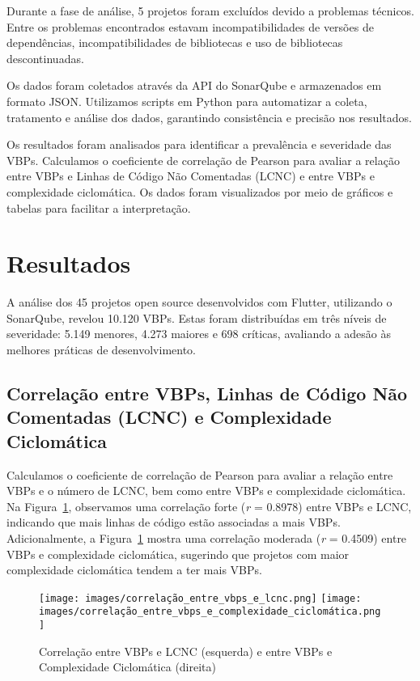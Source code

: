 \documentclass[12pt]{article}
\begin{document}
Durante a fase de análise, 5 projetos foram excluídos devido a problemas técnicos. Entre os problemas encontrados estavam incompatibilidades de versões de dependências, incompatibilidades de bibliotecas e uso de bibliotecas descontinuadas.

Os dados foram coletados através da API do SonarQube e armazenados em formato JSON. Utilizamos scripts em Python para automatizar a coleta, tratamento e análise dos dados, garantindo consistência e precisão nos resultados. 

Os resultados foram analisados para identificar a prevalência e severidade das VBPs. Calculamos o coeficiente de correlação de Pearson para avaliar a relação entre VBPs e Linhas de Código Não Comentadas (LCNC) e entre VBPs e complexidade ciclomática. Os dados foram visualizados por meio de gráficos e tabelas para facilitar a interpretação.

\section{Resultados}

A análise dos 45 projetos open source desenvolvidos com Flutter, utilizando o SonarQube, revelou 10.120 VBPs. Estas foram distribuídas em três níveis de severidade: 5.149 menores, 4.273 maiores e 698 críticas, avaliando a adesão às melhores práticas de desenvolvimento.

\subsection{Correlação entre VBPs, Linhas de Código Não Comentadas (LCNC) e Complexidade Ciclomática}
Calculamos o coeficiente de correlação de Pearson para avaliar a relação entre VBPs e o número de LCNC, bem como entre VBPs e complexidade ciclomática. Na Figura~\ref{fig:vbps_vs_lcnc_and_vbps_vs_complexity}, observamos uma correlação forte (\textit{r} = 0.8978) entre VBPs e LCNC, indicando que mais linhas de código estão associadas a mais VBPs. Adicionalmente, a Figura~\ref{fig:vbps_vs_lcnc_and_vbps_vs_complexity} mostra uma correlação moderada (\textit{r} = 0.4509) entre VBPs e complexidade ciclomática, sugerindo que projetos com maior complexidade ciclomática tendem a ter mais VBPs.

\begin{figure}[H]
\centering
\texttt{[image: images/correlação\_entre\_vbps\_e\_lcnc.png]}
\texttt{[image: images/correlação\_entre\_vbps\_e\_complexidade\_ciclomática.png]}
\caption{Correlação entre VBPs e LCNC (esquerda) e entre VBPs e Complexidade Ciclomática (direita)}
\label{fig:vbps_vs_lcnc_and_vbps_vs_complexity}
\end{figure}
\end{document}

